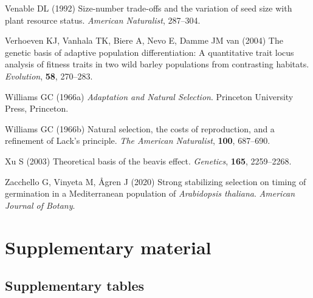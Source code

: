 \documentclass[]{article}
\begin{document}
\leavevmode\hypertarget{ref-Venable1992}{}%
Venable DL (1992) Size-number trade-offs and the variation of seed size with plant resource status. \emph{American Naturalist}, 287--304.

\leavevmode\hypertarget{ref-Verhoeven2004}{}%
Verhoeven KJ, Vanhala TK, Biere A, Nevo E, Damme JM van (2004) The genetic basis of adaptive population differentiation: A quantitative trait locus analysis of fitness traits in two wild barley populations from contrasting habitats. \emph{Evolution}, \textbf{58}, 270--283.

\leavevmode\hypertarget{ref-Williams1966}{}%
Williams GC (1966a) \emph{Adaptation and Natural Selection}. Princeton University Press, Princeton.

\leavevmode\hypertarget{ref-Williams1966a}{}%
Williams GC (1966b) Natural selection, the costs of reproduction, and a refinement of Lack's principle. \emph{The American Naturalist}, \textbf{100}, 687--690.

\leavevmode\hypertarget{ref-xu2003theoretical}{}%
Xu S (2003) Theoretical basis of the beavis effect. \emph{Genetics}, \textbf{165}, 2259--2268.

\leavevmode\hypertarget{ref-zacchello2020strong}{}%
Zacchello G, Vinyeta M, Ågren J (2020) Strong stabilizing selection on timing of germination in a Mediterranean population of \emph{Arabidopsis thaliana}. \emph{American Journal of Botany}.

\newpage

\hypertarget{supplementary-material}{%
\section*{Supplementary material}\label{supplementary-material}}

\setcounter{table}{0}  \renewcommand{\thetable}{S\arabic{table}} \setcounter{figure}{0} \renewcommand{\thefigure}{S\arabic{figure}}

\hypertarget{supplementary-tables}{%
\subsection{Supplementary tables}\label{supplementary-tables}}
\end{document}
